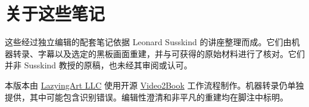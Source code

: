 \documentclass[11pt,oneside]{book}
\begin{document}
\frontmatter
\hypersetup{pageanchor=false}

\hypersetup{pageanchor=true}

\clearpage
\chapter*{关于这些笔记}
这些经过独立编辑的配套笔记依据 Leonard Susskind 的讲座整理而成。它们由机器转录、字幕以及选定的黑板画面重建，并与可获得的原始材料进行了核对。它们并非 Susskind 教授的原稿，也未经其审阅或认可。

本版本由 \href{https://lazying.art}{LazyingArt LLC} 使用开源 \href{https://github.com/lachlanchen/Video2Book}{Video2Book} 工作流程制作。机器转录仍单独提供，其中可能包含识别错误。编辑性澄清和非平凡的重建均在脚注中标明。
\clearpage
\tableofcontents
\mainmatter










\end{document}
